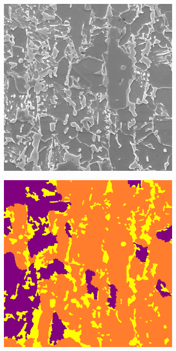 \documentclass[]{article}
\begin{document}
\begin{figure}[ht]
	\centering
	
	\begin{subfigure}[b]{0.3\textwidth}
		\centering
		\includegraphics[width=\textwidth]{images/inference/SameSteelSameMag-O.jpg}
		\caption{}
		\label{fig:samesteelsamemag-orig}
	\end{subfigure}
	\hfill
	\begin{subfigure}[b]{0.3\textwidth}
		\centering
		\includegraphics[width=\textwidth]{images/inference/SameSteelSameMag-L.png}

\end{subfigure}
\end{figure}
\end{document}
